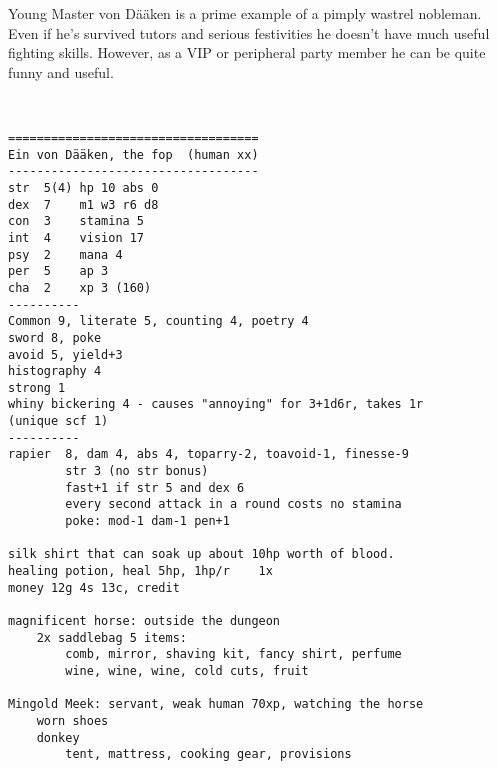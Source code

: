 \clearpage
\begin{samepage}

\noindent Young Master von Dääken is a prime example of a pimply wastrel nobleman. Even if he's survived tutors and serious festivities he doesn't have much useful fighting skills. However, as a VIP or peripheral party member he can be quite funny and useful. 

\

\small \begin{verbatim}
===================================
Ein von Dääken, the fop  (human xx)
-----------------------------------
str  5(4) hp 10 abs 0
dex  7    m1 w3 r6 d8
con  3    stamina 5
int  4    vision 17
psy  2    mana 4
per  5    ap 3
cha  2    xp 3 (160)
----------
Common 9, literate 5, counting 4, poetry 4
sword 8, poke
avoid 5, yield+3
histography 4
strong 1
whiny bickering 4 - causes "annoying" for 3+1d6r, takes 1r        (unique scf 1)
----------
rapier  8, dam 4, abs 4, toparry-2, toavoid-1, finesse-9
        str 3 (no str bonus)
        fast+1 if str 5 and dex 6
        every second attack in a round costs no stamina
        poke: mod-1 dam-1 pen+1

silk shirt that can soak up about 10hp worth of blood.
healing potion, heal 5hp, 1hp/r    1x
money 12g 4s 13c, credit

magnificent horse: outside the dungeon
    2x saddlebag 5 items:
        comb, mirror, shaving kit, fancy shirt, perfume
        wine, wine, wine, cold cuts, fruit

Mingold Meek: servant, weak human 70xp, watching the horse
    worn shoes
    donkey
        tent, mattress, cooking gear, provisions
\end{verbatim} \end{samepage} \normalsize






